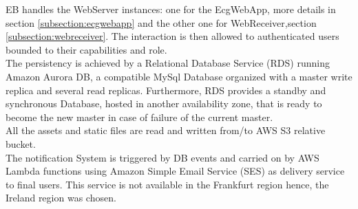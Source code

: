 EB handles the WebServer instances: one for the EcgWebApp, more details in section \ref{subsection:ecgwebapp} and the other one for WebReceiver,section \ref{subsection:webreceiver}. The interaction is then allowed to authenticated users bounded to their capabilities and role.\\
The persistency is achieved by a Relational Database Service (RDS) running Amazon Aurora DB, a compatible MySql Database organized with a master write replica and several read replicas.
Furthermore, RDS provides a standby and synchronous Database, hosted in another availability zone, that is ready to become the new master in case of failure of the current master.\\
All the assets and static files are read and written from/to AWS S3 relative bucket.\\
The notification System is triggered by DB events and carried on by AWS Lambda functions using Amazon Simple Email Service (SES) as delivery service to final users. This service is not available in the Frankfurt region hence, the Ireland region was chosen.


